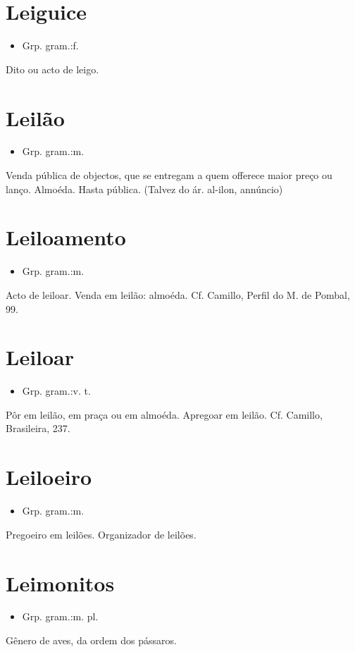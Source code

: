 \section{Leiguice}
\begin{itemize}
\item {Grp. gram.:f.}
\end{itemize}
Dito ou acto de leigo.
\section{Leilão}
\begin{itemize}
\item {Grp. gram.:m.}
\end{itemize}
Venda pública de objectos, que se entregam a quem offerece maior preço ou lanço.
Almoéda.
Hasta pública.
(Talvez do ár. \textunderscore al-ilon\textunderscore , annúncio)
\section{Leiloamento}
\begin{itemize}
\item {Grp. gram.:m.}
\end{itemize}
Acto de leiloar.
Venda em leilão: almoéda. Cf. Camillo, \textunderscore Perfil do M. de Pombal\textunderscore , 99.
\section{Leiloar}
\begin{itemize}
\item {Grp. gram.:v. t.}
\end{itemize}
Pôr em leilão, em praça ou em almoéda.
Apregoar em leilão. Cf. Camillo, \textunderscore Brasileira\textunderscore , 237.
\section{Leiloeiro}
\begin{itemize}
\item {Grp. gram.:m.}
\end{itemize}
Pregoeiro em leilões.
Organizador de leilões.
\section{Leimonitos}
\begin{itemize}
\item {Grp. gram.:m. pl.}
\end{itemize}
Gênero de aves, da ordem dos pássaros.
